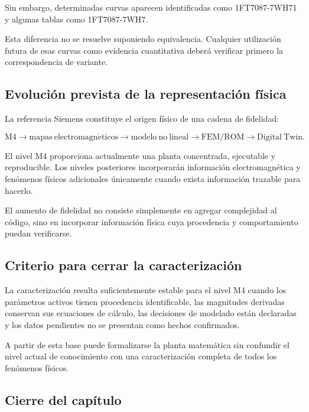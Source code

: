Sin embargo, determinadas curvas aparecen identificadas como 1FT7087-7WH71 y algunas tablas como 1FT7087-7WH7.

Esta diferencia no se resuelve suponiendo equivalencia. Cualquier utilización futura de esas curvas como evidencia cuantitativa deberá verificar primero la correspondencia de variante.

\subsection{Evolución prevista de la representación física}

La referencia Siemens constituye el origen físico de una cadena de fidelidad:

\begin{equation}
\mathrm{M4}
\rightarrow
\mathrm{mapas\ electromagn\acute{e}ticos}
\rightarrow
\mathrm{modelo\ no\ lineal}
\rightarrow
\mathrm{FEM/ROM}
\rightarrow
\mathrm{Digital\ Twin}.
\end{equation}

El nivel M4 proporciona actualmente una planta concentrada, ejecutable y reproducible. Los niveles posteriores incorporarán información electromagnética y fenómenos físicos adicionales únicamente cuando exista información trazable para hacerlo.

El aumento de fidelidad no consiste simplemente en agregar complejidad al código, sino en incorporar información física cuya procedencia y comportamiento puedan verificarse.

\subsection{Criterio para cerrar la caracterización}

La caracterización resulta suficientemente estable para el nivel M4 cuando los parámetros activos tienen procedencia identificable, las magnitudes derivadas conservan sus ecuaciones de cálculo, las decisiones de modelado están declaradas y los datos pendientes no se presentan como hechos confirmados.

A partir de esta base puede formalizarse la planta matemática sin confundir el nivel actual de conocimiento con una caracterización completa de todos los fenómenos físicos.

\subsection{Cierre del capítulo}

